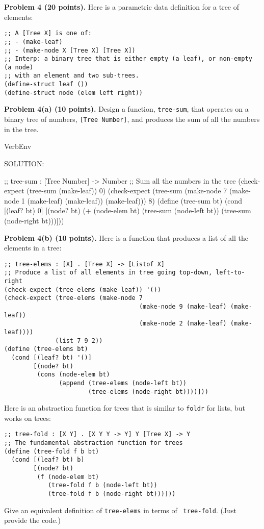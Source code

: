 \documentclass[12pt]{article}
\begin{document}


\newpage 
\noindent
{\bf Problem 4 (20 points).}
%
Here is a parametric data definition for a tree of elements:
\begin{verbatim}
;; A [Tree X] is one of:
;; - (make-leaf)
;; - (make-node X [Tree X] [Tree X])
;; Interp: a binary tree that is either empty (a leaf), or non-empty (a node)
;; with an element and two sub-trees.
(define-struct leaf ())
(define-struct node (elem left right))
\end{verbatim}
{\bf Problem 4(a) (10 points).} Design a function, {\tt tree-sum},
that operates on a binary tree of numbers, {\tt [Tree Number]}, and
produces the sum of all the numbers in the tree.

\begin{SaveVerbatim}{VerbEnv}


SOLUTION:

;; tree-sum : [Tree Number] -> Number
;; Sum all the numbers in the tree
(check-expect (tree-sum (make-leaf)) 0)
(check-expect (tree-sum (make-node 7 (make-node 1 (make-leaf) (make-leaf)) 
                                     (make-leaf)))
              8)
(define (tree-sum bt)
  (cond [(leaf? bt) 0]
        [(node? bt)
         (+ (node-elem bt)
            (tree-sum (node-left bt))
            (tree-sum (node-right bt)))]))

\end{SaveVerbatim}



\newpage

\noindent
{\bf Problem 4(b) (10 points).}
Here is a function that produces a list of all the elements in a tree:
\begin{verbatim}
;; tree-elems : [X] . [Tree X] -> [Listof X]
;; Produce a list of all elements in tree going top-down, left-to-right
(check-expect (tree-elems (make-leaf)) '())
(check-expect (tree-elems (make-node 7 
                                     (make-node 9 (make-leaf) (make-leaf))
                                     (make-node 2 (make-leaf) (make-leaf))))
              (list 7 9 2))
(define (tree-elems bt)
  (cond [(leaf? bt) '()]
        [(node? bt)
         (cons (node-elem bt)
               (append (tree-elems (node-left bt))
                       (tree-elems (node-right bt))))]))
\end{verbatim}
Here is an abstraction function for trees that is similar to
{\tt foldr} for lists, but works on trees:
\begin{verbatim}
;; tree-fold : [X Y] . [X Y Y -> Y] Y [Tree X] -> Y
;; The fundamental abstraction function for trees
(define (tree-fold f b bt)
  (cond [(leaf? bt) b]
        [(node? bt)
         (f (node-elem bt)
            (tree-fold f b (node-left bt))
            (tree-fold f b (node-right bt)))]))
\end{verbatim}
Give an equivalent definition of {\tt tree-elems} in terms of {\tt
  tree-fold}.  (Just provide the code.)
\end{document}
